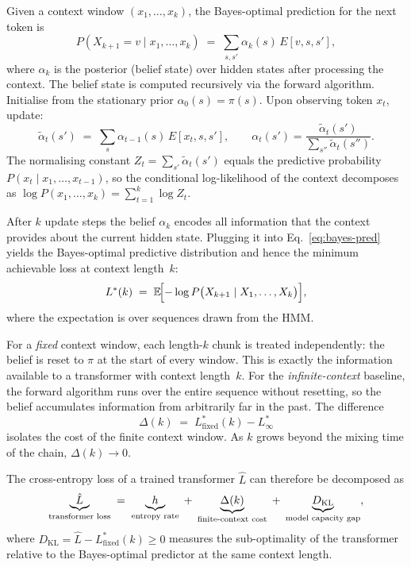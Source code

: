 \documentclass[11pt]{article}
\begin{document}
Given a context window $(x_1,\dots,x_k)$, the Bayes-optimal prediction
for the next token is
\begin{equation}\label{eq:bayes-pred}
  P(X_{k+1}{=}v \mid x_1,\dots,x_k)
  \;=\; \sum_{s,s'} \alpha_k(s)\, E[v,s,s'],
\end{equation}
where $\alpha_k$ is the posterior (belief state) over hidden states after
processing the context. The belief state is computed recursively via the forward algorithm.
Initialise from the stationary prior $\alpha_0(s) = \pi(s)$.  Upon
observing token $x_t$, update:
\begin{equation}\label{eq:forward}
  \tilde{\alpha}_t(s')
  \;=\; \sum_s \alpha_{t-1}(s)\, E[x_t, s, s'],
  \qquad
  \alpha_t(s') = \frac{\tilde{\alpha}_t(s')}
                      {\displaystyle\sum_{s''}\tilde{\alpha}_t(s'')}.
\end{equation}
The normalising constant $Z_t = \sum_{s'}\tilde{\alpha}_t(s')$ equals
the predictive probability $P(x_t \mid x_1,\dots,x_{t-1})$, so the
conditional log-likelihood of the context decomposes as
$\log P(x_1,\dots,x_k) = \sum_{t=1}^{k} \log Z_t$.

After $k$ update steps the belief $\alpha_k$ encodes all information
that the context provides about the current hidden state.  Plugging it
into Eq.~\eqref{eq:bayes-pred} yields the Bayes-optimal predictive
distribution and hence the minimum achievable loss at context length~$k$:
\begin{equation}\label{eq:Lstar}
  L^{*}(k)
  \;=\; \mathbb{E}\!\Bigl[
    -\log P\bigl(X_{k+1} \mid X_1,\dots,X_k\bigr)
  \Bigr],
\end{equation}
where the expectation is over sequences drawn from the HMM\@.

For a \emph{fixed} context window, each length-$k$ chunk is treated
independently: the belief is reset to $\pi$ at the start of every
window.  This is exactly the information available to a transformer with
context length~$k$.  For the \emph{infinite-context} baseline, the
forward algorithm runs over the entire sequence without resetting, so
the belief accumulates information from arbitrarily far in the past.
The difference
\begin{equation}
  \Delta(k) \;=\; L^{*}_{\text{fixed}}(k) - L^{*}_{\infty}
\end{equation}
isolates the cost of the finite context window.  As $k$ grows beyond the
mixing time of the chain, $\Delta(k) \to 0$.

The cross-entropy loss of a trained transformer $\hat{L}$ can therefore
be decomposed as
\begin{equation}\label{eq:loss-decomp}
  \underbrace{\hat{L}}_{\text{transformer loss}}
  \;=\; \underbrace{h\vphantom{\hat{L}}}_{\text{entropy rate}}
  \;+\; \underbrace{\Delta(k)\vphantom{\hat{L}}}_{\text{finite-context cost}}
  \;+\; \underbrace{D_{\mathrm{KL}}\vphantom{\hat{L}}}_{\text{model capacity gap}},
\end{equation}
where $D_{\mathrm{KL}} = \hat{L} - L^{*}_{\text{fixed}}(k) \ge 0$
measures the sub-optimality of the transformer relative to the
Bayes-optimal predictor at the same context length.
\end{document}
